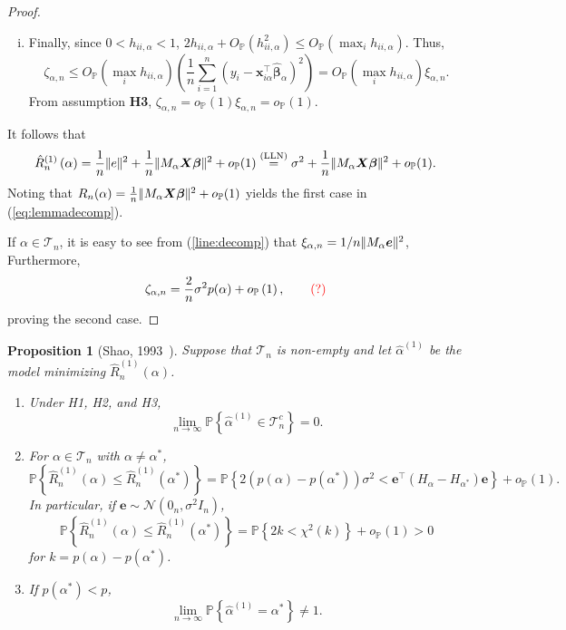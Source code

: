 \documentclass[12pt, letter paper]{article}
\newcommand{\1}{\mathmybb{1}}
\newtheorem{proposition}{Proposition}[section]
\newcommand{\0}{\emptyset}
\newcommand{\prob}{\mathbb{P}}
\newcommand{\paren}[1]{\left(#1 \right)}
\newcommand{\set}[1]{\left\{ #1 \right\}}
\newcommand{\norm}[1]{|\hspace{-1pt}|#1 |\hspace{-1pt}|}
\newcommand{\normsq}[1]{\norm{#1}^{2}}
\newcommand{\Tcal}{\mathcal{T}_{n}}
\newcommand{\Ncal}{\mathcal{N}}
\newcommand{\X}{\boldsymbol{X}}
\newcommand{\x}{\boldsymbol{x}}
\newcommand{\e}{\boldsymbol{e}}
\newcommand{\bbeta}{\boldsymbol{\beta}}
\newcommand{\bbetahat}{\boldsymbol{\hat{\beta}}}
\newcommand{\alphahat}[1]{\hat{\alpha}^{#1}}
\newcommand{\lev}{h_{ii,\alpha}}
\newcommand{\loocv}[1]{\hat{R}^{(1)}_{n}\paren{#1}}
\newcommand{\op}[1]{o_{\prob}\paren{#1}}
\newcommand{\Op}[1]{O_{\prob}\paren{#1}}
\begin{document}
\begin{proof}
\begin{enumerate}[i.]
        \item Finally, since \(0<\lev<1\), \(2\lev + \Op{\lev^{2}}\leq\Op{\max_{i}\lev}\). Thus,
        \[\zeta_{\alpha,n}\leq\Op{\max_{i}\lev}\paren{\frac{1}{n}\sum_{i=1}^{n}\paren{y_{i} - \x_{i\alpha}^{\top}\bbetahat_{\alpha}}^{2}} = \Op{\max_{i}\lev}\xi_{\alpha,n}.\]
        From assumption \textbf{H3}, \(\zeta_{\alpha,n} = o_{\prob}(1)\xi_{\alpha,n} = o_{\prob}(1)\).
    \end{enumerate}
    It follows that 
    \[\loocv{\alpha} = \frac{1}{n}\normsq{e} + \frac{1}{n}\normsq{M_{\alpha}\X\bbeta} + o_{\prob}(1) \stackrel{(\mathrm{LLN})}{=} \sigma^{2} + \frac{1}{n}\normsq{M_{\alpha}\X\bbeta} + o_{\prob}(1).\]
    Noting that \(R_{n}(\alpha) = \frac{1}{n}\normsq{M_{\alpha}\X\bbeta} + o_{\prob}(1)\) yields the first case in (\ref{eq:lemmadecomp}).

    If \(\alpha\in\Tcal\), it is easy to see from (\ref{line:decomp}) that \(\xi_{\alpha,n} = 1/n\normsq{M_{\alpha}\e}\), Furthermore,
    \[\zeta_{\alpha,n} = \frac{2}{n}\sigma^{2}p(\alpha) + \op{1},\qquad\textcolor{red}{(?)}\]
    proving the second case.
\end{proof}

\begin{proposition}[Shao, 1993~\cite{shao_1993}]
    Suppose that \(\Tcal\) is non-empty and let \(\alphahat{(1)}\) be the model minimizing \(\loocv{\alpha}\).
    \begin{enumerate}
        \item Under H1, H2, and H3, \[\lim_{n\to\infty}\prob\set{\alphahat{(1)}\in\Tcal^{c}}=0.\]
        \item For \(\alpha\in\Tcal\) with \(\alpha\neq\alpha^{*}\),\[\prob\set{\loocv{\alpha}\leq \loocv{\alpha^{*}}} = \prob\set{2\paren{p(\alpha) - p(\alpha^{*})}\sigma^{2} < \e^{\top}(H_{\alpha} - H_{\alpha^{*}})\e} + \op{1}.\] In particular, if \(\e\sim\Ncal(0_{n}, \sigma^{2}I_n)\), \[\prob\set{\loocv{\alpha}\leq \loocv{\alpha^{*}}} = \prob\set{2k < \chi^{2}(k)} + \op{1} > 0\] for \(k=p(\alpha) - p(\alpha^{*})\).
        \item If \(p(\alpha^*) < p\), \[\lim_{n\to\infty}\prob\set{\alphahat{(1)}=\alpha^{*}}\neq 1.\]
    \end{enumerate}
\end{proposition}
\end{document}
